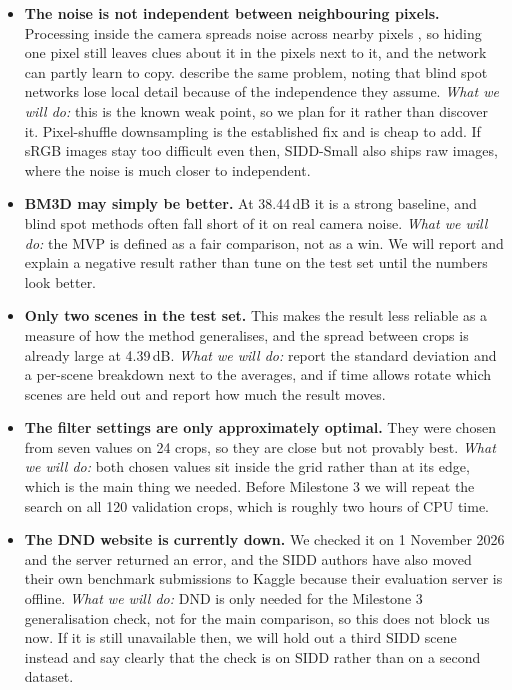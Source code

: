 \documentclass[11pt]{article}
\begin{document}
\begin{itemize}[leftmargin=*]
  \item \textbf{The noise is not independent between neighbouring pixels.} Processing inside
  the camera spreads noise across nearby pixels \citep{zhou2020awgn}, so hiding one pixel
  still leaves clues about it in the pixels next to it, and the network can partly learn to
  copy. \citet{cheng2025blindspot} describe the same problem, noting that blind spot
  networks lose local detail because of the independence they assume.
  \emph{What we will do:} this is the known weak point, so we plan for it rather than
  discover it. Pixel-shuffle downsampling is the established fix and is cheap to add. If
  sRGB images stay too difficult even then, SIDD-Small also ships raw images, where the
  noise is much closer to independent.
  \item \textbf{BM3D may simply be better.} At 38.44\,dB it is a strong baseline, and blind
  spot methods often fall short of it on real camera noise.
  \emph{What we will do:} the MVP is defined as a fair comparison, not as a win. We will
  report and explain a negative result rather than tune on the test set until the numbers
  look better.
  \item \textbf{Only two scenes in the test set.} This makes the result less reliable as a
  measure of how the method generalises, and the spread between crops is already large at
  4.39\,dB.
  \emph{What we will do:} report the standard deviation and a per-scene breakdown next to
  the averages, and if time allows rotate which scenes are held out and report how much the
  result moves.
  \item \textbf{The filter settings are only approximately optimal.} They were chosen from
  seven values on 24 crops, so they are close but not provably best.
  \emph{What we will do:} both chosen values sit inside the grid rather than at its edge,
  which is the main thing we needed. Before Milestone 3 we will repeat the search on all
  120 validation crops, which is roughly two hours of CPU time.
  \item \textbf{The DND website is currently down.} We checked it on 1 November 2026 and the
  server returned an error, and the SIDD authors have also moved their own benchmark
  submissions to Kaggle because their evaluation server is offline.
  \emph{What we will do:} DND is only needed for the Milestone 3 generalisation check, not
  for the main comparison, so this does not block us now. If it is still unavailable then,
  we will hold out a third SIDD scene instead and say clearly that the check is on SIDD
  rather than on a second dataset.
\end{itemize}
\end{document}
